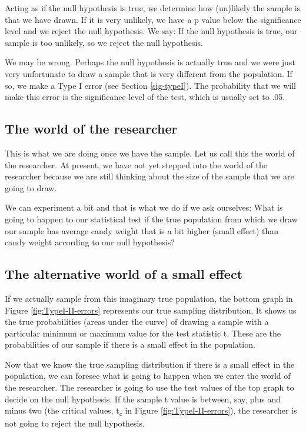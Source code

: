 \documentclass[a4paper]{book}
\theoremstyle{definition}
\theoremstyle{definition}
\theoremstyle{definition}
\theoremstyle{remark}
\begin{document}
Acting as if the null hypothesis is true, we determine how (un)likely
the sample is that we have drawn. If it is very unlikely, we have a p
value below the significance level and we reject the null hypothesis. We
say: If the null hypothesis is true, our sample is too unlikely, so we
reject the null hypothesis.

We may be wrong. Perhaps the null hypothesis is actually true and we
were just very unfortunate to draw a sample that is very different from
the population. If so, we make a Type I error (see Section
\ref{sig-typeI}). The probability that we will make this error is the
significance level of the test, which is usually set to .05.

\subsection{The world of the
researcher}\label{the-world-of-the-researcher}

This is what we are doing once we have the sample. Let us call this the
world of the researcher. At present, we have not yet stepped into the
world of the researcher because we are still thinking about the size of
the sample that we are going to draw.

We can experiment a bit and that is what we do if we ask ourselves: What
is going to happen to our statistical test if the true population from
which we draw our sample has average candy weight that is a bit higher
(small effect) than candy weight according to our null hypothesis?

\subsection{The alternative world of a small
effect}\label{the-alternative-world-of-a-small-effect}

If we actually sample from this imaginary true population, the bottom
graph in Figure \ref{fig:TypeI-II-errors} represents our true sampling
distribution. It shows us the true probabilities (areas under the curve)
of drawing a sample with a particular minimum or maximum value for the
test statistic t. These are the probabilities of our sample if there is
a small effect in the population.

Now that we know the true sampling distribution if there is a small
effect in the population, we can foresee what is going to happen when we
enter the world of the researcher. The researcher is going to use the
test values of the top graph to decide on the null hypothesis. If the
sample t value is between, say, plus and minus two (the critical values,
t\textsubscript{c} in Figure \ref{fig:TypeI-II-errors}), the researcher
is not going to reject the null hypothesis.
\end{document}
